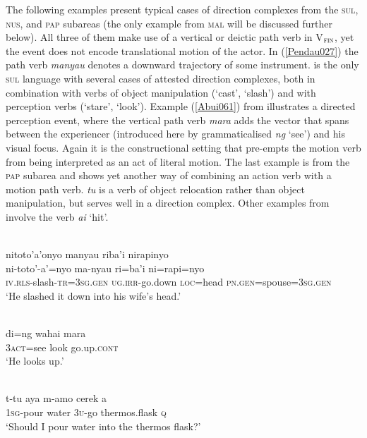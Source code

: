 The following examples present typical cases of direction complexes from the \textsc{sul}, \textsc{nus}, and \textsc{pap} subareas (the only example from \textsc{mal} will be discussed further below). All three of them make use of a vertical or deictic path verb in V$_{\textsc{fin}}$, yet the event does not encode translational motion of the actor. In (\ref{Pendau027}) the path verb \textit{manyau} denotes a downward trajectory of some instrument.  is the only \textsc{sul} language with several cases of attested direction complexes, both in combination with verbs of object manipulation (`cast', `slash') and with perception verbs (`stare', `look'). Example (\ref{Abui061}) from  illustrates a directed perception event, where the vertical path verb \textit{mara} adds the vector that spans between the experiencer (introduced here by grammaticalised \textit{ng} `see') and his visual focus. Again it is the constructional setting that pre-empts the motion verb from being interpreted as an act of literal motion. The last example is from the \textsc{pap} subarea and shows yet another way of combining an action verb with a motion path verb. \textit{tu} is a verb of object relocation rather than object manipulation, but serves well in a direction complex. Other examples from  involve the verb \textit{ai} `hit'.

\ea \label{Pendau027}
\\
\glll nitoto'a'onyo manyau riba'i nirapinyo \\
ni-toto'-a'=nyo ma-nyau ri=ba'i ni=rapi=nyo \\
\textsc{iv}.\textsc{rls}-slash-\textsc{tr}=\textsc{3}\textsc{sg}.\textsc{gen} \textsc{ug}.\textsc{irr}-go.down \textsc{loc}=head \textsc{pn}.\textsc{gen}=spouse=\textsc{3}\textsc{sg}.\textsc{gen} \\
\glft `He slashed it down into his wife's head.' \\ 
\z

\ea \label{Abui061}
\\
\gll di=ng wahai mara \\
\textsc{3}\textsc{act}=see look go.up.\textsc{cont} \\
\glft ‘He looks up.’\\ 
\z
\xe

\ea \label{Maybrat102}
\\
\gll t-tu aya m-amo cerek a \\
\textsc{1}\textsc{sg}-pour water \textsc{3}\textsc{u}-go thermos.flask \textsc{q} \\
\glft `Should I pour water into the thermos flask?'\\ 
\z

